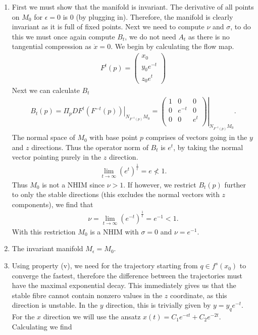 \begin{solution}[9.5]
\begin{enumerate}
	\item 
		First we must show that the manifold is invariant. The derivative of all points on $M_0$ for $\epsilon =0$ is 0 (by plugging in). Therefore, the manifold is clearly invariant as it is full of fixed points. Next we need to compute $\nu $ and $\sigma$, to do this we must once again compute $B_t$, we do not need $A_t$ as there is no tangential compression as $\dot{x}=0$. We begin by calculating the flow map. 
\begin{align}
	F^{t}(p) = 
	\begin{pmatrix}
		x_0 \\ y_0 e^{-t} \\ z_0 e^{t}
	\end{pmatrix}	
\end{align}
Next we can calculate $B_t$ 
\begin{align}
	B_t(p) = \left. \Pi_p DF^{t}(F^{-t}(p)) \right|_{N_{F^{-t}(p)}M_0} = 
	\left.
	\begin{pmatrix}
		1 & 0 & 0 \\
		0 &  e^{-t} & 0 \\
		0 & 0 &  e^{t} \\
	\end{pmatrix}
	\right|_{N_{F^{-t}(p)}M_0}
.\end{align}
The normal space of $M_0$ with base point $p$ comprises of vectors going in the $y$ and $z$ directions. Thus the operator norm of $B_t$ is $e^{t}$, by taking the normal vector pointing purely in the $z$ direction.
\begin{align}
	\lim_{t\to\infty} \left(e^{t}\right)^{\frac{1}{t}} = e \not< 1
.\end{align}
Thus $M_0$ is not a NHIM since $\nu > 1$. If however, we restrict $B_t(p)$ further to only the stable directions (this excludes the normal vectors with $z$ components), we find that
\begin{align}
	\nu = \lim_{t\to\infty} \left( e^{-t}\right)^{\frac{1}{t}} = e ^{-1}<1.
\end{align}
With this restriction $M_0$ is a NHIM with $\sigma=0$ and $\nu =e^{-1}$.
\item
	The invariant manifold $M_\epsilon = M_0$. 
\item
	Using property (v), we need for the trajectory starting from $q\in f^{s}(x_0)$ to converge the fastest, therefore the difference between the trajectories must have the maximal exponential decay. This immediately gives us that the stable fibre cannot contain nonzero values in the $z$ coordinate, as this direction is unstable. In the $y$ direction, this is trivially given by $y=y_q e^{-t}$. For the $x$ direction we will use the ansatz $x(t) = C_1 e^{-\epsilon t} + C_2 e^{-2t}$. Calculating we find

\end{enumerate}
\end{solution}
